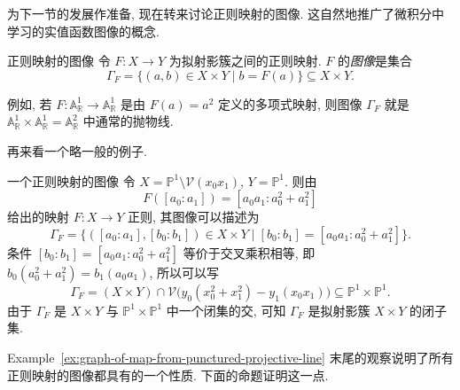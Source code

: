 为下一节的发展作准备, 现在转来讨论正则映射的图像. 这自然地推广了微积分中学习的实值函数图像的概念.

\begin{Definition}{正则映射的图像}\leavevmode\label{def:graph-of-quasiprojective-regular-map}
令 $F:X\to Y$ 为拟射影簇之间的正则映射. $F$ 的\emph{图像}是集合
\[
  \Gamma_{F}=\{(a,b)\in X\times Y\mid b=F(a)\}\subseteq X\times Y.
\]
\end{Definition}

例如, 若 $F:\mathbb{A}^{1}_{\mathbb{R}}\to\mathbb{A}^{1}_{\mathbb{R}}$ 是由 $F(a)=a^{2}$ 定义的多项式映射, 则图像 $\Gamma_{F}$ 就是 $\mathbb{A}^{1}_{\mathbb{R}}\times\mathbb{A}^{1}_{\mathbb{R}}=\mathbb{A}^{2}_{\mathbb{R}}$ 中通常的抛物线.

再来看一个略一般的例子.

\begin{Example}{一个正则映射的图像}\leavevmode\label{ex:graph-of-map-from-punctured-projective-line}
令 $X=\mathbb{P}^{1}\setminus\mathcal{V}(x_{0}x_{1})$, $Y=\mathbb{P}^{1}$. 则由
\[
  F([a_{0}:a_{1}])=[a_{0}a_{1}:a_{0}^{2}+a_{1}^{2}]
\]
给出的映射 $F:X\to Y$ 正则, 其图像可以描述为
\[
  \Gamma_{F}=\{([a_{0}:a_{1}],[b_{0}:b_{1}])\in X\times Y
    \mid[b_{0}:b_{1}]=[a_{0}a_{1}:a_{0}^{2}+a_{1}^{2}]\}.
\]
条件 $[b_{0}:b_{1}]=[a_{0}a_{1}:a_{0}^{2}+a_{1}^{2}]$ 等价于交叉乘积相等, 即 $b_{0}(a_{0}^{2}+a_{1}^{2})=b_{1}(a_{0}a_{1})$, 所以可以写
\[
  \Gamma_{F}=(X\times Y)\cap\mathcal{V}\bigl(y_{0}(x_{0}^{2}+x_{1}^{2})-y_{1}(x_{0}x_{1})\bigr)
    \subseteq\mathbb{P}^{1}\times\mathbb{P}^{1}.
\]
由于 $\Gamma_{F}$ 是 $X\times Y$ 与 $\mathbb{P}^{1}\times\mathbb{P}^{1}$ 中一个闭集的交, 可知 $\Gamma_{F}$ 是拟射影簇 $X\times Y$ 的闭子集.
\end{Example}

Example~\ref{ex:graph-of-map-from-punctured-projective-line} 末尾的观察说明了所有正则映射的图像都具有的一个性质. 下面的命题证明这一点.


